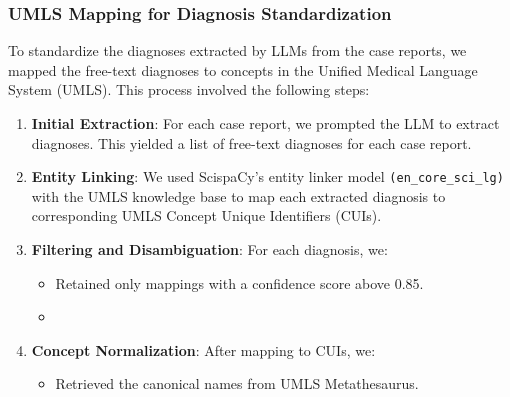 \subsubsection{UMLS Mapping for Diagnosis Standardization}
\label{ch05:apd:umls-mapping}

To standardize the diagnoses extracted by LLMs from the case reports, we mapped the free-text diagnoses to concepts in the Unified Medical Language System (UMLS). 
This process involved the following steps:

\begin{enumerate}
    \item \textbf{Initial Extraction}: For each case report, we prompted the LLM to extract diagnoses. 
    This yielded a list of free-text diagnoses for each case report.

    \item \textbf{Entity Linking}: We used ScispaCy's entity linker model 
    \texttt{(en\_core\_sci\_lg)} with the UMLS knowledge base to map each extracted diagnosis to corresponding UMLS Concept Unique Identifiers (CUIs). 

    \item \textbf{Filtering and Disambiguation}: For each diagnosis, we:
    \begin{itemize}
        \item Retained only mappings with a confidence score above 0.85.
        \item {}
    \end{itemize}

    \item \textbf{Concept Normalization}: After mapping to CUIs, we:
    \begin{itemize}
        \item Retrieved the canonical names from UMLS Metathesaurus.
    \end{itemize}
\end{enumerate}


